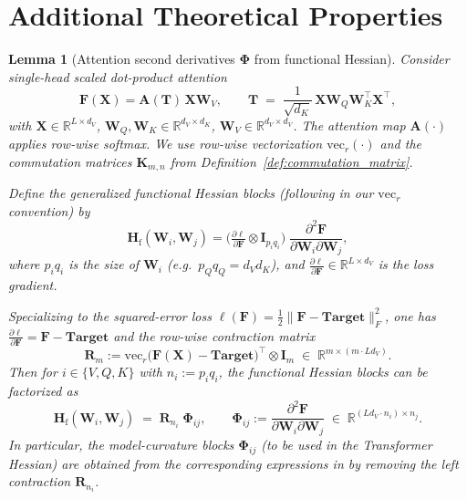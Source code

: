 \documentclass{article}
\newtheorem{lemma}{Lemma}
\begin{document}
\section{Additional Theoretical Properties} \label{app:additional_properties}

\begin{lemma}[Attention second derivatives $\boldsymbol{\Phi}$ from functional Hessian]\label{lem:attention_phi_from_functional_hessian}
Consider single-head scaled dot-product attention
\[
\mathbf{F}(\mathbf{X})
= \mathbf{A}(\mathbf{T}) \, \mathbf{X}\mathbf{W}_V,
\qquad
\mathbf{T} \;=\; \frac{1}{\sqrt{d_K}}\, \mathbf{X}\mathbf{W}_Q \mathbf{W}_K^\top \mathbf{X}^\top,
\]
with $\mathbf{X} \in \mathbb{R}^{L \times d_V}$, $\mathbf{W}_Q,\mathbf{W}_K \in \mathbb{R}^{d_V \times d_K}$, $\mathbf{W}_V \in \mathbb{R}^{d_V \times d_V}$. The attention map $\mathbf{A}(\cdot)$ applies row-wise softmax. We use row-wise vectorization $\mathrm{vec}_r(\cdot)$ and the commutation matrices $\mathbf{K}_{m,n}$ from Definition~\ref{def:commutation_matrix}.

Define the generalized functional Hessian blocks (following \cite{ormaniec2024attentionhessian} in our $\mathrm{vec}_r$ convention) by
\[
\mathbf{H}_{\mathrm{f}}(\mathbf{W}_i,\mathbf{W}_j)
= \big( \tfrac{\partial \ell}{\partial \mathbf{F}} \otimes \mathbf{I}_{p_i q_i} \big) \; \frac{\partial^2 \mathbf{F}}{\partial \mathbf{W}_i \partial \mathbf{W}_j},
\]
where $p_i q_i$ is the size of $\mathbf{W}_i$ (e.g.\ $p_Q q_Q = d_V d_K$), and $\tfrac{\partial \ell}{\partial \mathbf{F}} \in \mathbb{R}^{L \times d_V}$ is the loss gradient.

Specializing to the squared-error loss $\ell(\mathbf{F})=\tfrac{1}{2}\|\mathbf{F}-\mathbf{Target}\|_F^2$, one has $\tfrac{\partial \ell}{\partial \mathbf{F}}=\mathbf{F}-\mathbf{Target}$ and the row-wise contraction matrix
\[
\mathbf{R}_m := \mathrm{vec}_r\big(\mathbf{F}(\mathbf{X}) - \mathbf{Target}\big)^\top \otimes \mathbf{I}_m \;\in\; \mathbb{R}^{m \times (m \cdot L d_V)}.
\]
Then for $i \in \{V,Q,K\}$ with $n_i:=p_i q_i$, the functional Hessian blocks can be factorized as
\[
\mathbf{H}_{\mathrm{f}}(\mathbf{W}_i,\mathbf{W}_j) \;=\; \mathbf{R}_{n_i}\; \boldsymbol{\Phi}_{ij},
\qquad
\boldsymbol{\Phi}_{ij} := \frac{\partial^2 \mathbf{F}}{\partial \mathbf{W}_i \partial \mathbf{W}_j}
\;\in\; \mathbb{R}^{(L d_V \cdot n_i) \times n_j}.
\]
In particular, the model-curvature blocks $\boldsymbol{\Phi}_{ij}$ (to be used in the Transformer Hessian) are obtained from the corresponding expressions in \cite[Thm.~3.2]{ormaniec2024attentionhessian} by removing the left contraction $\mathbf{R}_{n_i}$.


\end{lemma}
\end{document}
